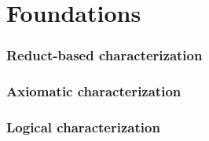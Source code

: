 \part{Foundations}

\section{Reduct-based characterization}

\section{Axiomatic characterization}


\section{Logical characterization}

%

